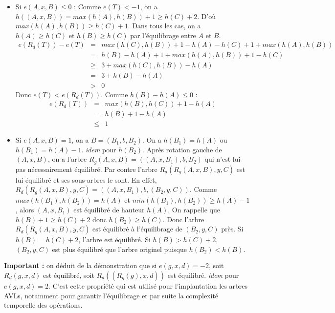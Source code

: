 \documentclass[../../../main.tex]{subfiles}
\begin{document}
\begin{itemize}
	\item Si $e(A, x, B) \leq 0$ :\newline
	Comme $e(T) < -1$, on a $h((A, x, B)) = max(h(A), h(B)) + 1\geq h(C) + 2$. \newline
D'où $max(h(A), h(B)) \geq h(C) + 1$. Dans tous les cas, on a $h(A)\geq h(C)$ et $h(B)\geq h(C)$ par l'équilibrage entre $A$ et $B$.
$$\begin{array}{lcl}
e(R_d(T)) - e(T) & = & max(h(C), h(B)) + 1 - h(A) - h(C) + 1 + max(h(A), h(B)) \\ 
& = & h(B) - h(A) + 1 + max(h(A), h(B)) + 1 - h(C) \\
& \geq & 3 + max(h(C), h(B)) - h(A) \\
& = & 3 + h(B) - h(A)\\ 
& > & 0
\end{array}$$
Donc $e(T) < e(R_d(T))$. Comme $h(B) - h(A) \leq 0$ :
$$\begin{array}{lcl}
e(R_d(T)) & = & max(h(B), h(C)) + 1 - h(A)\\
& = & h(B) + 1 - h(A) \\
& \leq & 1
\end{array}$$
	\item Si $e(A, x, B) = 1$, on a $B = (B_1, b, B_2)$. On a $h(B_1) = h(A)$ ou $h(B_1) = h(A) - 1$. \textit{idem} pour $h(B_2)$. Après rotation gauche de $(A, x, B)$, on a l'arbre $R_g(A, x, B) = ((A, x, B_1), b, B_2)$ qui n'est lui pas nécessairement équilibré. Par contre l'arbre $R_d(R_g(A, x, B), y, C)$ est lui équilibré et ses sous-arbres le sont. \newline
	En effet, $R_d(R_g(A, x, B), y, C) = ((A, x, B_1), b, (B_2, y, C))$. Comme $max(h(B_1), h(B_2)) = h(A)$ et $min(h(B_1), h(B_2)) \geq h(A)-1$, alors $(A, x, B_1)$ est équilibré de hauteur $h(A)$. On rappelle que $h(B) + 1\geq h(C) + 2$ donc $h(B_2)\geq h(C)$. Donc l'arbre $R_d(R_g(A, x, B), y, C)$ est équilibré à l'équilibrage de $(B_2, y, C)$ près. Si $h(B) = h(C) + 2$, l'arbre est équilibré. Si $h(B) > h(C) + 2$, $(B_2, y, C)$ est plus équilibré que l'arbre originel puisque $h(B_2) < h(B)$.
\end{itemize}
\textbf{Important :} on déduit de la démonstration que si $e(g, x, d) = -2$, soit $R_d(g, x, d)$ est équilibré, soit $R_d((R_g(g), x, d))$ est équilibré. \textit{idem} pour $e(g, x, d) = 2$. C'est cette propriété qui est utilisé pour l'implantation les arbres AVLs, notamment pour garantir l'équilibrage et par suite la complexité temporelle des opérations.
\end{document}
